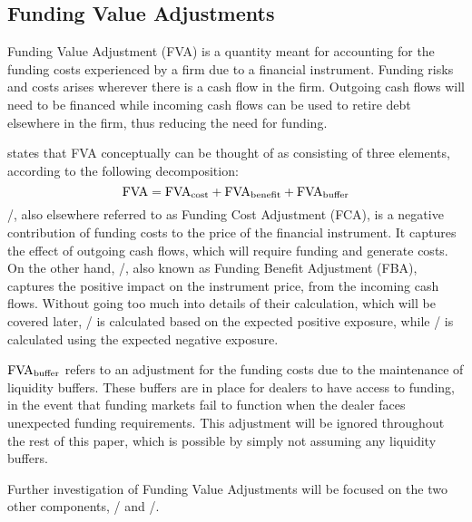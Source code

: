 \documentclass[main.tex]{subfiles}
\begin{document}
    \subsection{Funding Value Adjustments}
        Funding Value Adjustment (FVA) is a quantity meant for accounting for the funding costs 
        experienced by a firm due to a financial instrument.
        Funding risks and costs arises wherever there is a cash flow in the firm. 
        Outgoing cash flows will need to be financed while incoming cash flows
        can be used to retire debt elsewhere in the firm, thus reducing the need for funding.

        \cite[Proposition 6]{KPMGFVA} states that FVA conceptually can be thought of 
        as consisting of three elements, according to the following decomposition:
        \begin{equation}
            \FVA/ = \FCA/ + \FBA/ + \FVA/_{\text{buffer}}
        \end{equation}
        \FCA/, also elsewhere referred to as Funding Cost Adjustment (FCA), 
        is a negative contribution of funding costs to the price of the financial instrument.
        It captures the effect of outgoing cash flows, which will require funding and generate costs.
        On the other hand, \FBA/, also known as Funding Benefit Adjustment (FBA), 
        captures the positive impact on the instrument price, from the incoming cash flows.
        Without going too much into details of their calculation, which will be covered later,
        \FCA/ is calculated based on the expected positive exposure, 
        while \FBA/ is calculated using the expected negative exposure. 

        $\FVA/_{\text{buffer}}$ refers to an adjustment for the funding costs
        due to the maintenance of liquidity buffers. 
        These buffers are in place for dealers to have access to funding, in the event
        that funding markets fail to function when the dealer faces unexpected funding requirements.
        This adjustment will be ignored throughout the rest of this paper, 
        which is possible by simply not assuming any liquidity buffers. 
        
        Further investigation of Funding Value Adjustments will be focused on the two other components,
        \FCA/ and \FBA/.
\end{document}
